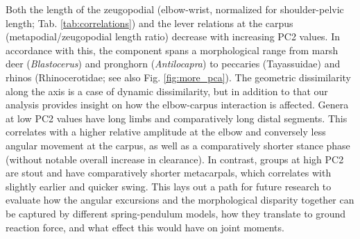 Both the length of the zeugopodial (elbow-wrist, normalized for shoulder-pelvic length; Tab. \ref{tab:correlations}) and the lever relations at the carpus (metapodial/zeugopodial length ratio) decrease with increasing PC2 values.
In accordance with this, the component spans a morphological range from marsh deer (\textit{Blastocerus}) and pronghorn (\textit{Antilocapra}) to peccaries (Tayassuidae) and rhinos (Rhinocerotidae; see also Fig. \ref*{fig:more_pca}).
The geometric dissimilarity along the axis is a case of dynamic dissimilarity, but in addition to that our analysis provides insight on how the elbow-carpus interaction is affected.
Genera at low PC2 values have long limbs and comparatively long distal segments.
This correlates with a higher relative amplitude at the elbow and conversely less angular movement at the carpus, as well as a comparatively shorter stance phase (without notable overall increase in clearance).
In contrast, groups at high PC2 are stout and have comparatively shorter metacarpals, which correlates with slightly earlier and quicker swing.
This lays out a path for future research to evaluate how the angular excursions and the morphological disparity together can be captured by different spring-pendulum models, how they translate to ground reaction force, and what effect this would have on joint moments.





\FloatBarrier\pagebreak
